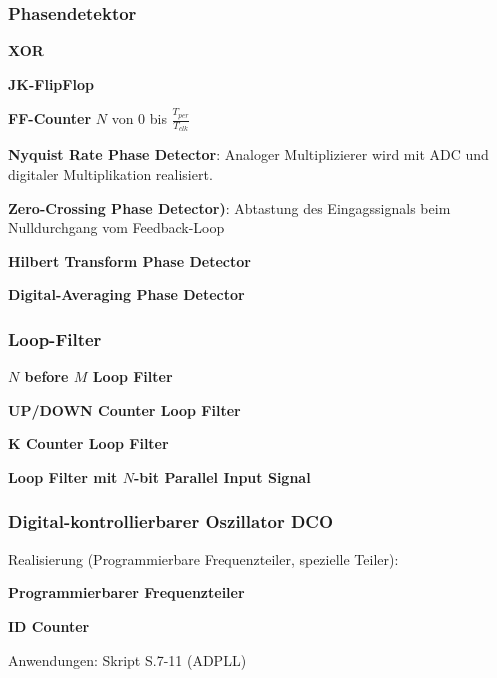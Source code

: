 \begin{multicols}{2}
    \subsubsection{Phasendetektor}
    \begin{compactitem}
        \item \textbf{XOR}  
         \item \textbf{JK-FlipFlop} 
         \item \textbf{FF-Counter} $N$ von $0$ bis $\frac{T_{per}}{T_{clk}}$
         \item \textbf{Nyquist Rate Phase Detector}: Analoger Multiplizierer wird mit ADC und digitaler Multiplikation realisiert.
         \item \textbf{Zero-Crossing Phase Detector)}: Abtastung des Eingagssignals beim Nulldurchgang vom Feedback-Loop
         \item \textbf{Hilbert Transform Phase Detector}
         \item \textbf{Digital-Averaging Phase Detector}
    \end{compactitem}
    
    \subsubsection{Loop-Filter}
    \begin{compactitem}
         \item \textbf{\boldmath$N$ before \boldmath$M$ Loop Filter}  
         \item \textbf{UP/DOWN Counter Loop Filter} 
         \item \textbf{K Counter Loop Filter} 
         \item \textbf{Loop Filter mit \boldmath$N$-bit Parallel Input Signal}
    \end{compactitem}
    
    \subsubsection{Digital-kontrollierbarer Oszillator DCO}
    Realisierung (Programmierbare Frequenzteiler, spezielle Teiler):
    \begin{compactitem}
         \item \textbf{Programmierbarer Frequenzteiler}  
         \item \textbf{ID Counter} 
    \end{compactitem}
    Anwendungen: Skript S.7-11 (ADPLL)
\end{multicols}
